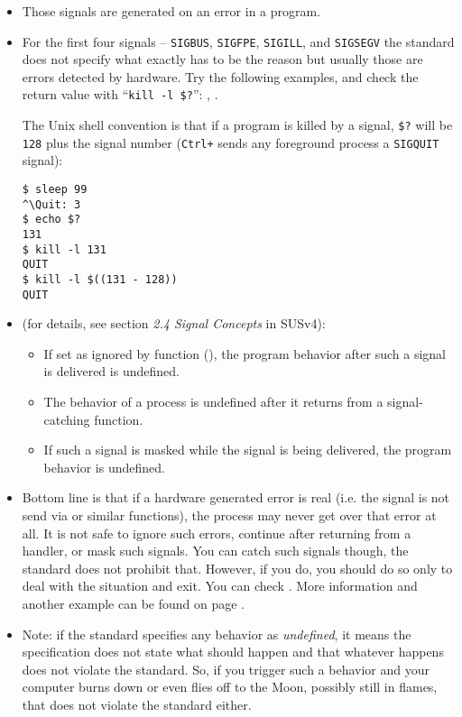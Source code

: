 \begin{itemize}
\item Those signals are generated on an error in a program.
\item \label{SHELLRETVALUEFORSIGNALS} For the first four signals --
\texttt{SIGBUS}, \texttt{SIGFPE}, \texttt{SIGILL}, and \texttt{SIGSEGV} the
standard does not specify what exactly has to be the reason but usually those
are errors detected by hardware.  Try the following examples, and check the
return value with ``\texttt{kill -l \$?}'': ,
.

\par The Unix shell convention is that if a program is killed by a signal,
\texttt{\$?} will be \texttt{128} plus the signal number (\texttt{Ctrl+\bs}
sends any foreground process a \texttt{SIGQUIT} signal):

\begin{verbatim}
$ sleep 99
^\Quit: 3
$ echo $?
131
$ kill -l 131
QUIT
$ kill -l $((131 - 128))
QUIT
\end{verbatim}

\item \label{SPECIALSIGNALS}  (for details, see section \emph{2.4 Signal Concepts} in
SUSv4):
\begin{itemize}
\item If set as ignored by function (), the program behavior
after such a signal is delivered is undefined.
\item The behavior of a process is undefined after it returns from a
signal-catching function.
\item If such a signal is masked while the signal is being delivered, the
program behavior is undefined.
\end{itemize}
\item Bottom line is that if a hardware generated error is real (i.e. the signal
is not send via  or similar functions), the process may never get
over that error at all.  It is not safe to ignore such errors, continue after
returning from a handler, or mask such signals.  You can catch such signals
though, the standard does not prohibit that.  However, if you do, you should do
so only to deal with the situation and exit.
You can check . More information and another
example can be found on page \pageref{THREADS_SIGWAIT}.
\item Note: if the standard specifies any behavior as \emph{undefined}, it means
the specification does not state what should happen and that whatever happens
does not violate the standard.  So, if you trigger such a behavior and your
computer burns down or even flies off to the Moon, possibly still in flames,
that does not violate the standard either.
\end{itemize}

